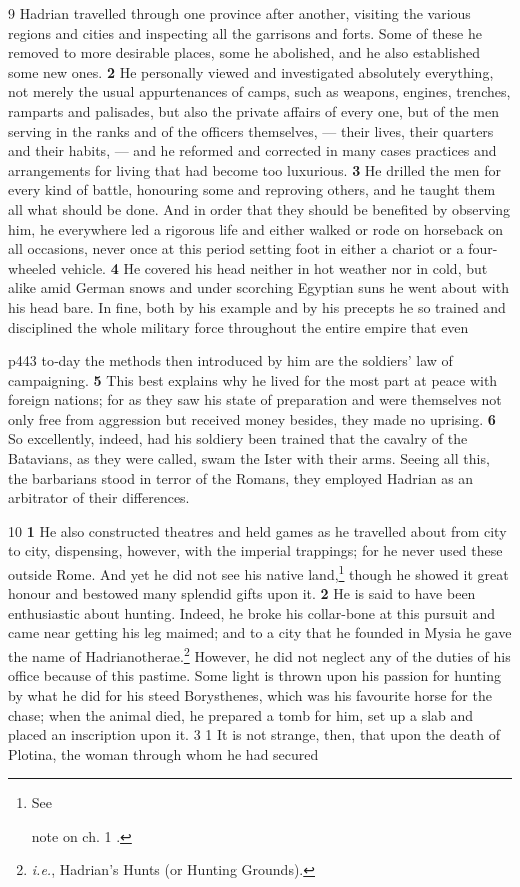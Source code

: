 9 Hadrian travelled through one province after another, visiting the various regions and cities and inspecting all the garrisons and forts. Some of these he removed to more desirable places, some he abolished, and he also established some new ones. \textbf{2} He personally viewed and investigated absolutely everything, not merely the usual appurtenances of camps, such as weapons, engines, trenches, ramparts and palisades, but also the private affairs of every one, but of the men serving in the ranks and of the officers themselves, \texthebrew{—} their lives, their quarters and their habits, \texthebrew{—} and he reformed and corrected in many cases practices and arrangements for living that had become too luxurious. \textbf{3} He drilled the men for every kind of battle, honouring some and reproving others, and he taught them all what should be done. And in order that they should be benefited by observing him, he everywhere led a rigorous life and either walked or rode on horseback on all occasions, never once at this period setting foot in either a chariot or a four-wheeled vehicle. \textbf{4} He covered his head neither in hot weather nor in cold, but alike amid German snows and under scorching Egyptian suns he went about with his head bare. In fine, both by his example and by his precepts he so trained and disciplined the whole military force throughout the entire empire that even

p443 to\texthebrew{‑}day the methods then introduced by him are the soldiers' law of campaigning. \textbf{5} This best explains why he lived for the most part at peace with foreign nations; for as they saw his state of preparation and were themselves not only free from aggression but received money besides, they made no uprising. \textbf{6} So excellently, indeed, had his soldiery been trained that the cavalry of the Batavians, as they were called, swam the Ister with their arms. Seeing all this, the barbarians stood in terror of the Romans, they employed Hadrian as an arbitrator of their differences.

10
\textbf{1} He also constructed theatres and held games as he travelled about from city to city, dispensing, however, with the imperial trappings; for he never used these outside Rome. And yet he did not see his native land,\texthebrew{⁠}\footnote{See

note on ch. 1 .

} though he showed it great honour and bestowed many splendid gifts upon it. \textbf{2} He is said to have been enthusiastic about hunting. Indeed, he broke his collar-bone at this pursuit and came near getting his leg maimed; and to a city that he founded in Mysia he gave the name of Hadrianotherae.\texthebrew{⁠}\footnote{\emph{i.e.}, Hadrian's Hunts (or Hunting Grounds).

} However, he did not neglect any of the duties of his office because of this pastime. Some light is thrown upon his passion for hunting by what he did for his steed Borysthenes, which was his favourite horse for the chase; when the animal died, he prepared a tomb for him, set up a slab and placed an inscription upon it. 3 1 It is not strange, then, that upon the death of Plotina, the woman through whom he had secured

